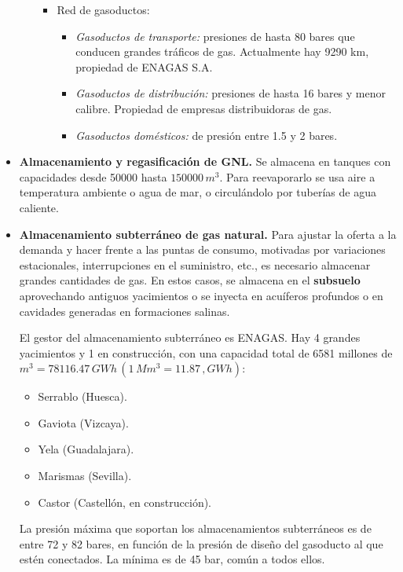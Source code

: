 \begin{itemize}
\begin{itemize}
\begin{itemize}
						\item Red de gasoductos:
							\begin{itemize}
								\item \textit{Gasoductos de transporte:} presiones de hasta 80 bares que conducen grandes tráficos de gas. Actualmente hay 9290 km, propiedad de ENAGAS S.A.
								
								\item \textit{Gasoductos de distribución:} presiones de hasta 16 bares y menor calibre. Propiedad de empresas distribuidoras de gas.
								
								\item \textit{Gasoductos domésticos:} de presión entre 1.5 y 2 bares.
							\end{itemize}
					\end{itemize}
				\end{itemize}
				
				\item \textbf{Almacenamiento y regasificación de GNL.}
					Se almacena en tanques con capacidades desde 50000 hasta $150000\,m^3$. Para reevaporarlo se usa aire a temperatura ambiente o agua de mar, o circulándolo por tuberías de agua caliente.
				
				\item \textbf{Almacenamiento subterráneo de gas natural.}
					Para ajustar la oferta a la demanda y hacer frente a las puntas de consumo, motivadas por
					variaciones estacionales, interrupciones en el suministro, etc., es necesario almacenar grandes
					cantidades de gas. En estos casos, se almacena en el \textbf{subsuelo} aprovechando antiguos yacimientos o se inyecta en acuíferos profundos o en cavidades generadas en formaciones salinas.
					
					
					El gestor del almacenamiento subterráneo es ENAGAS. Hay 4 grandes yacimientos y 1 en construcción, con una capacidad total de 6581 millones de $m^3 = 78116.47\,GWh\,(1\,Mm^3 = 11.87\,,GWh)$:
					\begin{itemize}
						\item Serrablo (Huesca).
						\item Gaviota (Vizcaya).
						\item Yela (Guadalajara).
						\item Marismas (Sevilla).
						\item Castor (Castellón, en construcción).
					\end{itemize}
					
					
					La presión máxima que soportan los almacenamientos subterráneos es de entre 72 y 82 bares, en
					función de la presión de diseño del gasoducto al que estén conectados. La mínima es de 45 bar,
					común a todos ellos.
				
			\end{itemize}
			
